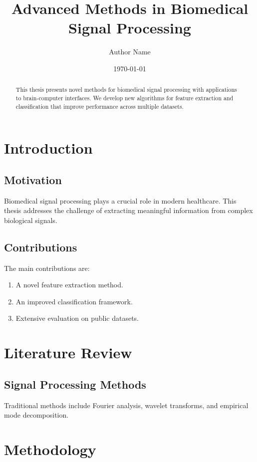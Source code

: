 \documentclass[12pt, a4paper]{report}
\begin{document}
\title{Advanced Methods in Biomedical Signal Processing}
\author{Author Name}
\date{\today}
\maketitle

\begin{abstract}
This thesis presents novel methods for biomedical signal
processing with applications to brain-computer interfaces.
We develop new algorithms for feature extraction and
classification that improve performance across multiple
datasets.
\end{abstract}

\tableofcontents
\listoffigures
\listoftables

\chapter{Introduction}
\section{Motivation}
Biomedical signal processing plays a crucial role in
modern healthcare. This thesis addresses the challenge
of extracting meaningful information from complex
biological signals.

\section{Contributions}
The main contributions are:
\begin{enumerate}
\item A novel feature extraction method.
\item An improved classification framework.
\item Extensive evaluation on public datasets.
\end{enumerate}

\chapter{Literature Review}
\section{Signal Processing Methods}
Traditional methods include Fourier analysis, wavelet
transforms, and empirical mode decomposition.

\chapter{Methodology}
\end{document}
